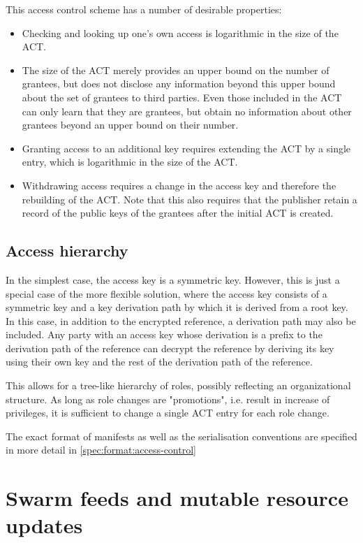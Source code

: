 This access control scheme has a number of desirable properties:
\begin{itemize}
\item Checking and looking up one's own access is logarithmic in the size of the ACT.
\item The size of the ACT merely provides an upper bound on the number of grantees, but does not disclose any information beyond this upper bound about the set of grantees to third parties. Even those included in the ACT can only learn that they are grantees, but obtain no information about other grantees beyond an upper bound on their number.
\item Granting access to an additional key requires extending the ACT by a single entry, which is logarithmic in the size of the ACT. 
\item Withdrawing access requires a change in the access key and therefore the rebuilding of the ACT. Note that this also requires that the publisher retain a record of the public keys of the grantees after the initial ACT is created.
\end{itemize}

\subsection{Access hierarchy\statusgreen}

In the simplest case, the access key is a symmetric key. However, this is just a special case of the more flexible solution, where
the access key consists of a symmetric key and a key derivation path by which it is derived from a root key. In this case, in addition to the encrypted reference, a derivation path may also be included. Any party with an access key whose derivation is a prefix to the derivation path of the reference can decrypt the reference by deriving its key using their own key and the rest of the derivation path of the reference.

This allows for a tree-like hierarchy of roles, possibly reflecting an organizational structure. As long as role changes are "promotions", i.e. result in increase of privileges, it is sufficient to change a single ACT entry for each role change.

The exact format of manifests as well as the serialisation conventions are specified in more detail in \ref{spec:format:access-control}



\section{Swarm feeds and mutable resource updates \statusyellow}\label{sec:feeds}

